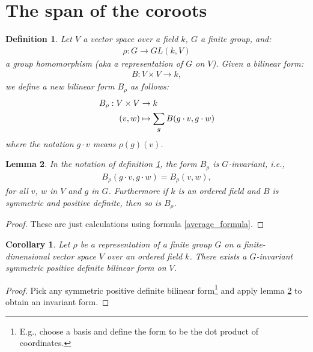 \documentclass[12pt, a4paper]{article}
\newtheorem{lemma}{Lemma}[section]
\newtheorem{corollary}{Corollary}[section]
\newtheorem{definition}[lemma]{Definition}
\begin{document}
\section{The span of the coroots}
\begin{definition}\label{def:average_bilinear_form}
  Let $V$ a vector space over a field $k$, $G$ a finite group, and:
  \begin{align*}
    \rho : G \to GL(k, V)
  \end{align*}
  a group homomorphism (aka a representation of $G$ on $V$). Given a bilinear form:
  \begin{align*}
    B : V \times V \to k,
  \end{align*}
  we define a new bilinear form $B_\rho$ as follows:
  \begin{align}\label{average_formula}
    B_\rho : V \times V &\to k\notag\\
    (v, w) &\mapsto \sum_g B (g \cdot v, g \cdot w)
  \end{align}
  where the notation $g \cdot v$ means $\rho(g)(v)$.
\end{definition}

\begin{lemma}\label{lem:average_bilinear_form}
  In the notation of definition \ref{def:average_bilinear_form}, the form $B_\rho$ is $G$-invariant,
  i.e.,
  \begin{align*}
    B_\rho(g \cdot v, g \cdot w) = B_\rho(v, w),
  \end{align*}
  for all $v$, $w$ in $V$ and $g$ in $G$. Furthermore if $k$ is an ordered field and $B$ is
  symmetric and positive definite, then so is $B_\rho$.
\end{lemma}
\begin{proof}
  These are just calculations using formula \eqref{average_formula}.
\end{proof}

\begin{corollary}\label{cor:average_bilinear_form}
  Let $\rho$ be a representation of a finite group $G$ on a finite-dimensional vector space $V$ over
  an ordered field $k$. There exists a $G$-invariant symmetric positive definite bilinear form on
  $V$.
\end{corollary}
\begin{proof}
  Pick any symmetric positive definite bilinear form\footnote{E.g., choose a basis and define the
  form to be the dot product of coordinates.} and apply lemma \ref{lem:average_bilinear_form} to
  obtain an invariant form.
\end{proof}
\end{document}
